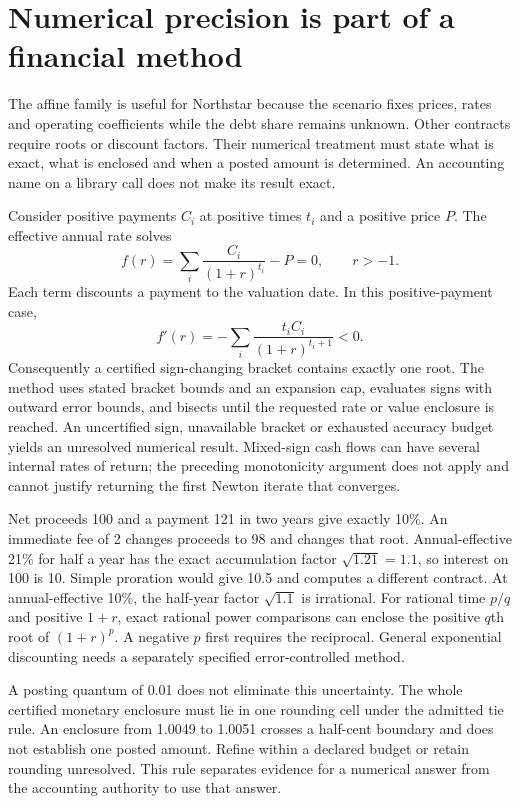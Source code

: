 \section{Numerical precision is part of a financial method}
\label{sec:numerical-methods}

The affine family is useful for Northstar because the scenario fixes prices,
rates and operating coefficients while the debt share remains unknown. Other
contracts require roots or discount factors. Their numerical treatment must
state what is exact, what is enclosed and when a posted amount is determined.
An accounting name on a library call does not make its result exact.

Consider positive payments $C_i$ at positive times $t_i$ and a positive price
$P$. The effective annual rate solves
\[
 f(r)=\sum_i\frac{C_i}{(1+r)^{t_i}}-P=0,\qquad r>-1.
\]
Each term discounts a payment to the valuation date. In this positive-payment
case,
\[
 f'(r)=-\sum_i\frac{t_i C_i}{(1+r)^{t_i+1}}<0.
\]
Consequently a certified sign-changing bracket contains exactly one root.
The method uses stated bracket bounds and an expansion cap, evaluates signs
with outward error bounds, and bisects until the requested rate or value
enclosure is reached. An uncertified sign, unavailable bracket or exhausted
accuracy budget yields an unresolved numerical result. Mixed-sign cash flows
can have several internal rates of return; the preceding monotonicity argument
does not apply and cannot justify returning the first Newton iterate that
converges.

Net proceeds 100 and a payment 121 in two years give exactly 10\%. An immediate
fee of 2 changes proceeds to 98 and changes that root. Annual-effective 21\%
for half a year has the exact accumulation factor $\sqrt{1.21}=1.1$, so interest
on 100 is 10. Simple proration would give 10.5 and computes a different contract.
At annual-effective 10\%, the half-year factor $\sqrt{1.1}$ is irrational. For
rational time $p/q$ and positive $1+r$, exact rational power comparisons can
enclose the positive $q$th root of $(1+r)^p$. A negative $p$ first requires the
reciprocal. General exponential discounting needs a separately specified
error-controlled method.

A posting quantum of 0.01 does not eliminate this uncertainty. The whole
certified monetary enclosure must lie in one rounding cell under the admitted
tie rule. An enclosure from 1.0049 to 1.0051 crosses a half-cent boundary and
does not establish one posted amount. Refine within a declared budget or retain
rounding unresolved. This rule separates evidence for a numerical answer from
the accounting authority to use that answer.

